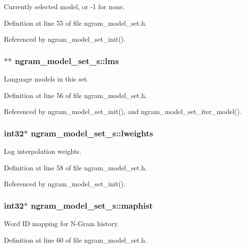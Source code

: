 Currently selected model, or -1 for none. 



Definition at line 55 of file ngram\_\-model\_\-set.h.

Referenced by ngram\_\-model\_\-set\_\-init().
\subsubsection[{lms}]{$\ast$$\ast$ {\bf ngram\_\-model\_\-set\_\-s::lms}}\label{structngram__model__set__s_862d4c4feb5a903101f4a0fdc5ba8a62}


Language models in this set. 



Definition at line 56 of file ngram\_\-model\_\-set.h.

Referenced by ngram\_\-model\_\-set\_\-init(), and ngram\_\-model\_\-set\_\-iter\_\-model().
\subsubsection[{lweights}]{\setlength{\rightskip}{0pt plus 5cm}int32$\ast$ {\bf ngram\_\-model\_\-set\_\-s::lweights}}\label{structngram__model__set__s_11068bb0029c788c506bec4507dd6d23}


Log interpolation weights. 



Definition at line 58 of file ngram\_\-model\_\-set.h.

Referenced by ngram\_\-model\_\-set\_\-init().
\subsubsection[{maphist}]{\setlength{\rightskip}{0pt plus 5cm}int32$\ast$ {\bf ngram\_\-model\_\-set\_\-s::maphist}}\label{structngram__model__set__s_f34ca232338c2d8c7dc8d13869ac09fd}


Word ID mapping for N-Gram history. 



Definition at line 60 of file ngram\_\-model\_\-set.h.


